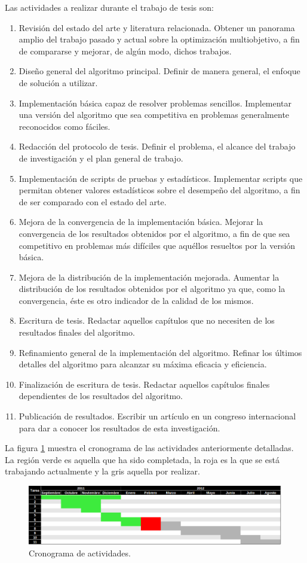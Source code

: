 \documentclass[english]{article}
\begin{document}
Las actividades a realizar durante el trabajo de tesis son:
\begin{enumerate}
\item Revisión del estado del arte y literatura relacionada. Obtener un panorama amplio del trabajo pasado y actual sobre la optimización multiobjetivo, a fin de compararse y mejorar, de algún modo, dichos trabajos.
\item Diseño general del algoritmo principal. Definir de manera general, el enfoque de solución a utilizar.
\item Implementación básica capaz de resolver problemas sencillos. Implementar una versión del algoritmo que sea competitiva en problemas generalmente reconocidos como fáciles.
\item Redacción del protocolo de tesis. Definir el problema, el alcance del trabajo de investigación y el plan general de trabajo.
\item Implementación de scripts de pruebas y estadísticos. Implementar scripts que permitan obtener valores estadísticos sobre el desempeño del algoritmo, a fin de ser comparado con el estado del arte.
\item Mejora de la convergencia de la implementación básica. Mejorar la convergencia de los resultados obtenidos por el algoritmo, a fin de que sea competitivo en problemas más difíciles que aquéllos resueltos por la versión básica.
\item Mejora de la distribución de la implementación mejorada. Aumentar la distribución de los resultados obtenidos por el algoritmo ya que, como la convergencia, éste es otro indicador de la calidad de los mismos.
\item Escritura de tesis. Redactar aquellos capítulos que no necesiten de los resultados finales del algoritmo.
\item Refinamiento general de la implementación del algoritmo. Refinar los últimos detalles del algoritmo para alcanzar su máxima eficacia y eficiencia.
\item Finalización de escritura de tesis. Redactar aquellos capítulos finales dependientes de los resultados del algoritmo.
\item Publicación de resultados. Escribir un artículo en un congreso internacional para dar a conocer los resultados de esta investigación.
\end{enumerate}

La figura \ref{fig:Cronograma-de-actividades} muestra el cronograma de las actividades anteriormente detalladas. La región verde es aquella que ha sido completada, la roja es la que se está trabajando actualmente y la gris aquella por realizar.

\begin{figure}
\includegraphics[scale=0.5]{images/cronograma}
\caption{\label{fig:Cronograma-de-actividades}Cronograma de actividades.}
\end{figure}
\end{document}
